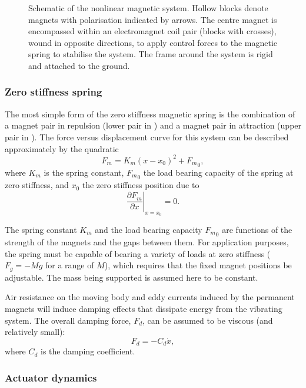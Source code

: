 \begin{figure}
  \centering
  \caption{Schematic of the nonlinear magnetic system. Hollow blocks
    denote magnets with polarisation indicated by arrows. The centre
    magnet is encompassed within an electromagnet coil pair (blocks
    with crosses), wound in opposite directions, to apply control
    forces to the magnetic spring to stabilise the system. The frame
    around the system is rigid and attached to the ground.}
\end{figure}

\subsubsection{Zero stiffness spring}

The most simple form of the zero stiffness magnetic spring is the
combination of a magnet pair in repulsion (lower pair in
) and a magnet pair in attraction (upper pair in
). The force versus displacement curve for this
system can be described approximately by the quadratic~\cite{robertson2006}
\begin{equation}
  F_m = K_m(x-x_0)^2+{F_m}_0 ,
\end{equation}
where $K_m$ is the spring constant, ${F_m}_0$ the load bearing
capacity of the spring at zero stiffness, and $x_0$ the zero
stiffness position due to
\begin{equation}
  \left.\frac{\partial F_m}{\partial x}\right|_{x=x_0}=0 .
\end{equation}

The spring constant $K_m$ and the load bearing capacity ${F_m}_0$ are
functions of the strength of the magnets and the gaps between them. For
application purposes, the spring must be capable of bearing a variety
of loads at zero stiffness ($F_g=-Mg$ for a range of $M$), which
requires that the fixed magnet positions be adjustable. The mass being
supported is assumed here to be constant.

Air resistance on the moving body and eddy currents induced by the
permanent magnets will induce damping effects that dissipate energy
from the vibrating system. The overall damping force, $F_d$, can be
assumed to be viscous (and relatively small):
\begin{equation}
  F_d = -C_d\dot x ,
\end{equation}
where $C_d$ is the damping coefficient.

\subsubsection{Actuator dynamics}


